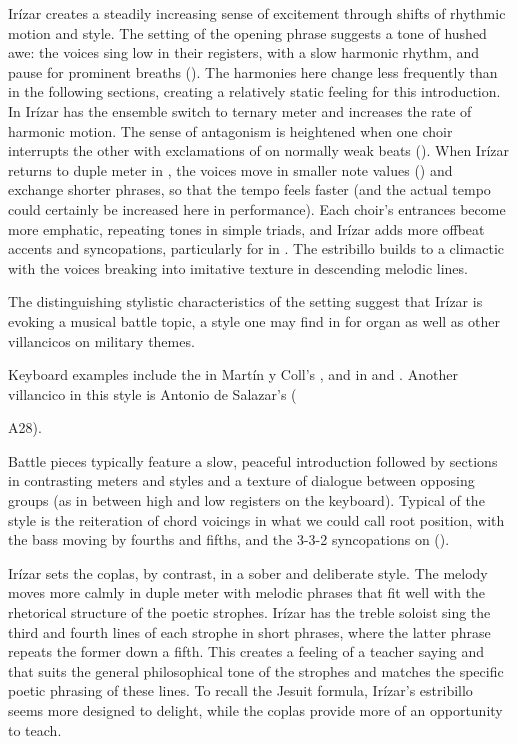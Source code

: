 Irízar creates a steadily increasing sense of excitement through shifts of rhythmic motion and style.
The setting of the opening phrase suggests a tone of hushed awe: the voices sing low in their registers, with a slow harmonic rhythm, and pause for prominent breaths ().
The harmonies here change less frequently than in the following sections, creating a relatively static feeling for this introduction.
In  Irízar has the ensemble switch to ternary meter and increases the rate of harmonic motion.
The sense of antagonism is heightened when one choir interrupts the other with exclamations of  on normally weak beats ().
When Irízar returns to duple meter in , the voices move in smaller note values () and exchange shorter phrases, so that the tempo feels faster (and the actual tempo could certainly be increased here in performance).
Each choir's entrances become more emphatic, repeating tones in simple triads, and Irízar adds more offbeat accents and syncopations, particularly for  in .
The estribillo builds to a climactic  with the voices breaking into imitative texture in descending melodic lines.

The distinguishing stylistic characteristics of the setting suggest that Irízar is evoking a musical battle topic, a style one may find in  for organ as well as other villancicos on military themes.%
\begin{Footnote}
  Keyboard examples include the  in Martín y Coll's \citXXX, and in  and .
  Another villancico in this style is Antonio de Salazar's  (\signature{MEX-Mc}{A28}).
\end{Footnote}
Battle pieces typically feature a slow, peaceful introduction followed by sections in contrasting meters and styles and a texture of dialogue between opposing groups (as in between high and low registers on the keyboard). 
Typical of the style is the reiteration of chord voicings in what we could call root position, with the bass moving by fourths and fifths, and the 3-3-2 syncopations on  ().

Irízar sets the coplas, by contrast, in a sober and deliberate style.
The melody moves more calmly in duple meter with melodic phrases that fit well with the rhetorical structure of the poetic strophes.
Irízar has the treble soloist sing the third and fourth lines of each strophe in short phrases, where the latter phrase repeats the former down a fifth.
This creates a feeling of a teacher saying  and  that suits the general philosophical tone of the strophes and matches the specific poetic phrasing of these lines.
To recall the Jesuit formula, Irízar's estribillo seems more designed to delight, while the coplas provide more of an opportunity to teach.

